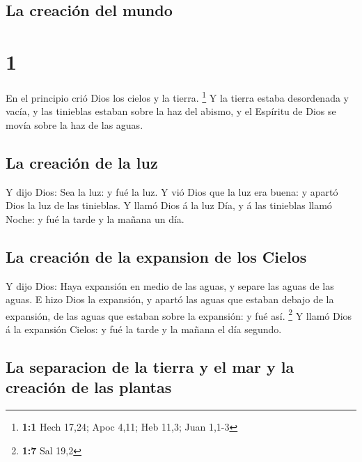\hypertarget{la-creaciuxf3n-del-mundo}{%
\subsection{La creación del mundo}\label{la-creaciuxf3n-del-mundo}}

\hypertarget{section}{%
\section{1}\label{section}}

 En el principio crió Dios los cielos y la tierra.
\footnote{\textbf{1:1} Hech 17,24; Apoc 4,11; Heb 11,3; Juan 1,1-3}
 Y la tierra estaba desordenada y vacía, y las tinieblas
estaban sobre la haz del abismo, y el Espíritu de Dios se movía sobre la
haz de las aguas.

\hypertarget{la-creaciuxf3n-de-la-luz}{%
\subsection{La creación de la luz}\label{la-creaciuxf3n-de-la-luz}}

 Y dijo Dios: Sea la luz: y fué la luz.  Y
vió Dios que la luz era buena: y apartó Dios la luz de las tinieblas.
 Y llamó Dios á la luz Día, y á las tinieblas llamó Noche:
y fué la tarde y la mañana un día.

\hypertarget{la-creaciuxf3n-de-la-expansion-de-los-cielos}{%
\subsection{La creación de la expansion de los
Cielos}\label{la-creaciuxf3n-de-la-expansion-de-los-cielos}}

 Y dijo Dios: Haya expansión en medio de las aguas, y
separe las aguas de las aguas.  E hizo Dios la expansión,
y apartó las aguas que estaban debajo de la expansión, de las aguas que
estaban sobre la expansión: y fué así. \footnote{\textbf{1:7} Sal 19,2}
 Y llamó Dios á la expansión Cielos: y fué la tarde y la
mañana el día segundo.

\hypertarget{la-separacion-de-la-tierra-y-el-mar-y-la-creaciuxf3n-de-las-plantas}{%
\subsection{La separacion de la tierra y el mar y la creación de las
plantas}\label{la-separacion-de-la-tierra-y-el-mar-y-la-creaciuxf3n-de-las-plantas}}

